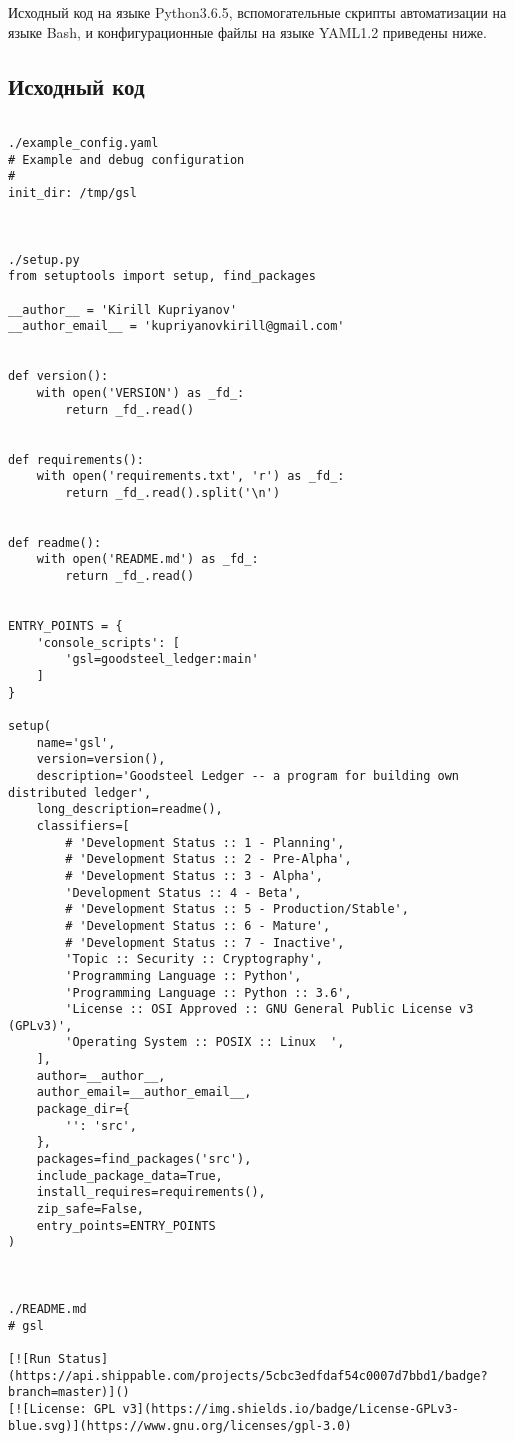 Исходный код на языке Python3.6.5, вспомогательные скрипты автоматизации на языке
Bash, и конфигурационные файлы на языке YAML1.2 приведены ниже.

\subsection{Исходный код}

\begin{lstlisting}

./example_config.yaml
# Example and debug configuration
#
init_dir: /tmp/gsl



./setup.py
from setuptools import setup, find_packages

__author__ = 'Kirill Kupriyanov'
__author_email__ = 'kupriyanovkirill@gmail.com'


def version():
    with open('VERSION') as _fd_:
        return _fd_.read()


def requirements():
    with open('requirements.txt', 'r') as _fd_:
        return _fd_.read().split('\n')


def readme():
    with open('README.md') as _fd_:
        return _fd_.read()


ENTRY_POINTS = {
    'console_scripts': [
        'gsl=goodsteel_ledger:main'
    ]
}

setup(
    name='gsl',
    version=version(),
    description='Goodsteel Ledger -- a program for building own distributed ledger',
    long_description=readme(),
    classifiers=[
        # 'Development Status :: 1 - Planning',
        # 'Development Status :: 2 - Pre-Alpha',
        # 'Development Status :: 3 - Alpha',
        'Development Status :: 4 - Beta',
        # 'Development Status :: 5 - Production/Stable',
        # 'Development Status :: 6 - Mature',
        # 'Development Status :: 7 - Inactive',
        'Topic :: Security :: Cryptography',
        'Programming Language :: Python',
        'Programming Language :: Python :: 3.6',
        'License :: OSI Approved :: GNU General Public License v3 (GPLv3)',
        'Operating System :: POSIX :: Linux  ',
    ],
    author=__author__,
    author_email=__author_email__,
    package_dir={
        '': 'src',
    },
    packages=find_packages('src'),
    include_package_data=True,
    install_requires=requirements(),
    zip_safe=False,
    entry_points=ENTRY_POINTS
)



./README.md
# gsl

[![Run Status](https://api.shippable.com/projects/5cbc3edfdaf54c0007d7bbd1/badge?branch=master)]()
[![License: GPL v3](https://img.shields.io/badge/License-GPLv3-blue.svg)](https://www.gnu.org/licenses/gpl-3.0)



\end{lstlisting}
